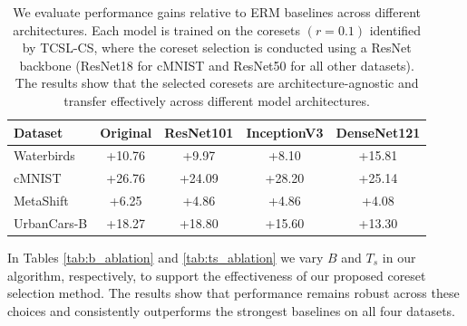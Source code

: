 \documentclass[letter,11pt]{article}
\begin{document}
\begin{table}[!hbtp]
\centering
\small
\setlength{\tabcolsep}{4pt} %
\begin{tabular}{lcccc}
\toprule
\textbf{Dataset} & \textbf{Original} & \textbf{ResNet101} & \textbf{InceptionV3} & \textbf{DenseNet121} \\
\midrule
Waterbirds   & +10.76 & +9.97 & +8.10 & +15.81 \\
cMNIST       & +26.76 & +24.09 & +28.20 & +25.14 \\
MetaShift    & +6.25  & +4.86 & +4.86 & +4.08 \\
UrbanCars-B  & +18.27 & +18.80 & +15.60 & +13.30 \\
\bottomrule
\end{tabular}
\caption{We evaluate performance gains relative to ERM baselines across different architectures. Each model is trained on the coresets $(r=0.1)$ identified by TCSL-CS, where the coreset selection is conducted using a ResNet backbone (ResNet18 for cMNIST and ResNet50 for all other datasets). The results show that the selected coresets are architecture-agnostic and transfer effectively across different model architectures.}
\label{tab:tab_cross_arc_wga}
\end{table}

In Tables \ref{tab:b_ablation} and \ref{tab:ts_ablation} we vary $B$ and $T_s$ in our algorithm, respectively, to support the effectiveness of our proposed coreset selection method. The results show that performance remains robust across these choices and consistently outperforms the strongest baselines on all four datasets.

\begin{table}[!hbtp]
\centering
{}
\caption{We compare the WGA and AVG for different $B$ at $r=0.1$ across datasets. Results are averaged over 3 seeds. The best WGA for each dataset is shown in \textbf{bold} and the second-best value is \underline{underlined}. $B=50$ represents what was originally reported.}
\label{tab:b_ablation}
\end{table}
\end{document}
